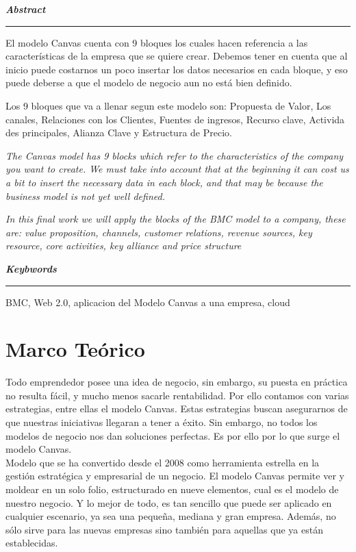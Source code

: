 \documentclass[10pt,a4paper]{article}
\begin{document}
		\begin{multicols}{2}
		\textbf{\textit{\large Abstract}}\rule[1.5mm]{5mm}{0.1mm} El modelo Canvas cuenta con 9 bloques los cuales hacen referencia a las características de la empresa que se quiere crear. Debemos tener en cuenta que al inicio puede costarnos un poco insertar los datos necesarios en cada bloque, y eso puede deberse a que el modelo de negocio aun no está bien definido.
		
		Los 9 bloques que va a llenar segun este modelo son: Propuesta de Valor, Los canales, Relaciones con los Clientes, Fuentes de ingresos, Recurso clave, Activida des principales, Alianza Clave y Estructura de Precio.
				
		\textit{The Canvas model has 9 blocks which refer to the characteristics of the company you want to create. We must take into account that at the beginning it can cost us a bit to insert the necessary data in each block, and that may be because the business model is not yet well defined.}
		
		\textit{In this final work we will apply the blocks of the BMC model to a company, these are: value proposition, channels, customer relations, revenue sources, key resource, core activities, key alliance and price structure}
		
		\vspace{\baselineskip}
			
		\textbf{\textit{\large Keybwords}}\rule[1.5mm]{5mm}{0.1mm} BMC, Web 2.0, aplicacion del Modelo Canvas a una empresa, cloud
		
		\columnbreak
		
		\section{Marco Teórico} 
		
		Todo emprendedor posee una idea de negocio, sin embargo, su puesta en práctica no resulta fácil, y mucho menos sacarle rentabilidad. Por ello contamos con varias estrategias, entre ellas el modelo Canvas. Estas estrategias buscan asegurarnos de que nuestras iniciativas llegaran a tener a éxito. Sin embargo, no todos los modelos de negocio nos dan soluciones perfectas. Es por ello por lo que surge el modelo Canvas.\\
		
		Modelo que se ha convertido desde el 2008 como herramienta estrella en la gestión estratégica y empresarial de un negocio. El modelo Canvas permite ver y moldear en un solo folio, estructurado en nueve elementos, cual es el modelo de nuestro negocio.  Y lo mejor de todo, es tan sencillo que puede ser aplicado en cualquier escenario, ya sea una pequeña, mediana y gran empresa.  Además, no sólo sirve para las nuevas empresas sino también para aquellas que ya están establecidas. \\
		

\end{multicols}
\end{document}
